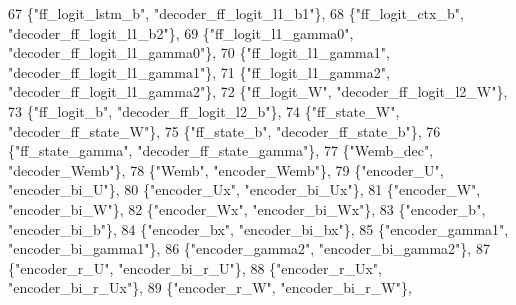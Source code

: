 \begin{DoxyCode}
67            \{\textcolor{stringliteral}{"ff\_logit\_lstm\_b"}, \textcolor{stringliteral}{"decoder\_ff\_logit\_l1\_b1"}\},
68            \{\textcolor{stringliteral}{"ff\_logit\_ctx\_b"}, \textcolor{stringliteral}{"decoder\_ff\_logit\_l1\_b2"}\},
69            \{\textcolor{stringliteral}{"ff\_logit\_l1\_gamma0"}, \textcolor{stringliteral}{"decoder\_ff\_logit\_l1\_gamma0"}\},
70            \{\textcolor{stringliteral}{"ff\_logit\_l1\_gamma1"}, \textcolor{stringliteral}{"decoder\_ff\_logit\_l1\_gamma1"}\},
71            \{\textcolor{stringliteral}{"ff\_logit\_l1\_gamma2"}, \textcolor{stringliteral}{"decoder\_ff\_logit\_l1\_gamma2"}\},
72            \{\textcolor{stringliteral}{"ff\_logit\_W"}, \textcolor{stringliteral}{"decoder\_ff\_logit\_l2\_W"}\},
73            \{\textcolor{stringliteral}{"ff\_logit\_b"}, \textcolor{stringliteral}{"decoder\_ff\_logit\_l2\_b"}\},
74            \{\textcolor{stringliteral}{"ff\_state\_W"}, \textcolor{stringliteral}{"decoder\_ff\_state\_W"}\},
75            \{\textcolor{stringliteral}{"ff\_state\_b"}, \textcolor{stringliteral}{"decoder\_ff\_state\_b"}\},
76            \{\textcolor{stringliteral}{"ff\_state\_gamma"}, \textcolor{stringliteral}{"decoder\_ff\_state\_gamma"}\},
77            \{\textcolor{stringliteral}{"Wemb\_dec"}, \textcolor{stringliteral}{"decoder\_Wemb"}\},
78            \{\textcolor{stringliteral}{"Wemb"}, \textcolor{stringliteral}{"encoder\_Wemb"}\},
79            \{\textcolor{stringliteral}{"encoder\_U"}, \textcolor{stringliteral}{"encoder\_bi\_U"}\},
80            \{\textcolor{stringliteral}{"encoder\_Ux"}, \textcolor{stringliteral}{"encoder\_bi\_Ux"}\},
81            \{\textcolor{stringliteral}{"encoder\_W"}, \textcolor{stringliteral}{"encoder\_bi\_W"}\},
82            \{\textcolor{stringliteral}{"encoder\_Wx"}, \textcolor{stringliteral}{"encoder\_bi\_Wx"}\},
83            \{\textcolor{stringliteral}{"encoder\_b"}, \textcolor{stringliteral}{"encoder\_bi\_b"}\},
84            \{\textcolor{stringliteral}{"encoder\_bx"}, \textcolor{stringliteral}{"encoder\_bi\_bx"}\},
85            \{\textcolor{stringliteral}{"encoder\_gamma1"}, \textcolor{stringliteral}{"encoder\_bi\_gamma1"}\},
86            \{\textcolor{stringliteral}{"encoder\_gamma2"}, \textcolor{stringliteral}{"encoder\_bi\_gamma2"}\},
87            \{\textcolor{stringliteral}{"encoder\_r\_U"}, \textcolor{stringliteral}{"encoder\_bi\_r\_U"}\},
88            \{\textcolor{stringliteral}{"encoder\_r\_Ux"}, \textcolor{stringliteral}{"encoder\_bi\_r\_Ux"}\},
89            \{\textcolor{stringliteral}{"encoder\_r\_W"}, \textcolor{stringliteral}{"encoder\_bi\_r\_W"}\},

\end{DoxyCode}
